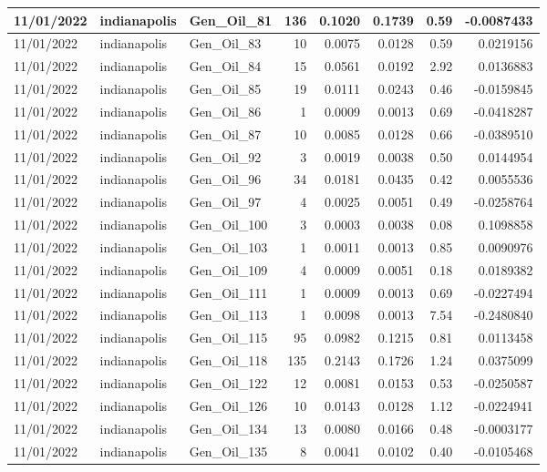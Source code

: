 \documentclass[
  letterpaper,
  DIV=11,
  numbers=noendperiod]{scrartcl}
\begin{document}
\begin{tabular}{l|l|l|r|r|r|r|r}
\hline
11/01/2022 & indianapolis & Gen\_Oil\_81 & 136 & 0.1020 & 0.1739 & 0.59 & -0.0087433\\
\hline
11/01/2022 & indianapolis & Gen\_Oil\_83 & 10 & 0.0075 & 0.0128 & 0.59 & 0.0219156\\
\hline
11/01/2022 & indianapolis & Gen\_Oil\_84 & 15 & 0.0561 & 0.0192 & 2.92 & 0.0136883\\
\hline
11/01/2022 & indianapolis & Gen\_Oil\_85 & 19 & 0.0111 & 0.0243 & 0.46 & -0.0159845\\
\hline
11/01/2022 & indianapolis & Gen\_Oil\_86 & 1 & 0.0009 & 0.0013 & 0.69 & -0.0418287\\
\hline
11/01/2022 & indianapolis & Gen\_Oil\_87 & 10 & 0.0085 & 0.0128 & 0.66 & -0.0389510\\
\hline
11/01/2022 & indianapolis & Gen\_Oil\_92 & 3 & 0.0019 & 0.0038 & 0.50 & 0.0144954\\
\hline
11/01/2022 & indianapolis & Gen\_Oil\_96 & 34 & 0.0181 & 0.0435 & 0.42 & 0.0055536\\
\hline
11/01/2022 & indianapolis & Gen\_Oil\_97 & 4 & 0.0025 & 0.0051 & 0.49 & -0.0258764\\
\hline
11/01/2022 & indianapolis & Gen\_Oil\_100 & 3 & 0.0003 & 0.0038 & 0.08 & 0.1098858\\
\hline
11/01/2022 & indianapolis & Gen\_Oil\_103 & 1 & 0.0011 & 0.0013 & 0.85 & 0.0090976\\
\hline
11/01/2022 & indianapolis & Gen\_Oil\_109 & 4 & 0.0009 & 0.0051 & 0.18 & 0.0189382\\
\hline
11/01/2022 & indianapolis & Gen\_Oil\_111 & 1 & 0.0009 & 0.0013 & 0.69 & -0.0227494\\
\hline
11/01/2022 & indianapolis & Gen\_Oil\_113 & 1 & 0.0098 & 0.0013 & 7.54 & -0.2480840\\
\hline
11/01/2022 & indianapolis & Gen\_Oil\_115 & 95 & 0.0982 & 0.1215 & 0.81 & 0.0113458\\
\hline
11/01/2022 & indianapolis & Gen\_Oil\_118 & 135 & 0.2143 & 0.1726 & 1.24 & 0.0375099\\
\hline
11/01/2022 & indianapolis & Gen\_Oil\_122 & 12 & 0.0081 & 0.0153 & 0.53 & -0.0250587\\
\hline
11/01/2022 & indianapolis & Gen\_Oil\_126 & 10 & 0.0143 & 0.0128 & 1.12 & -0.0224941\\
\hline
11/01/2022 & indianapolis & Gen\_Oil\_134 & 13 & 0.0080 & 0.0166 & 0.48 & -0.0003177\\
\hline
11/01/2022 & indianapolis & Gen\_Oil\_135 & 8 & 0.0041 & 0.0102 & 0.40 & -0.0105468\\

\end{tabular}
\end{document}
